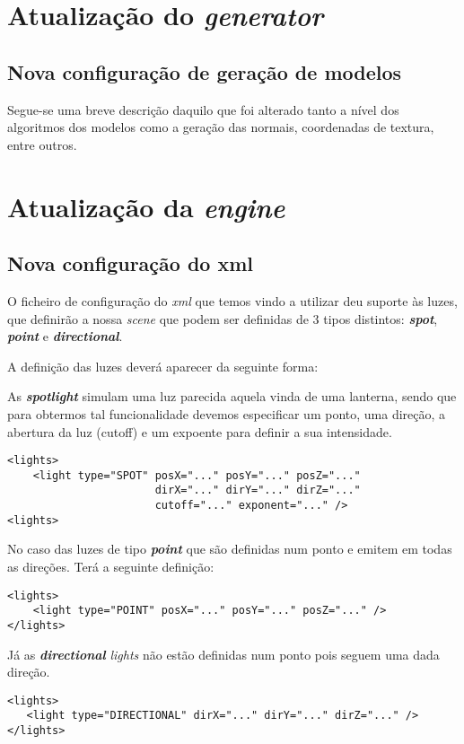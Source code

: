 \documentclass[11pt,a4paper]{report}
\begin{document}
\chapter{Atualização do \emph{generator}}
\section{Nova configuração de geração de modelos}

Segue-se uma breve descrição daquilo que foi alterado tanto a nível dos algoritmos dos modelos como a geração das normais, coordenadas de textura, entre outros.

\chapter{Atualização da \emph{engine}}

\section{Nova configuração do xml}
O ficheiro de configuração do \emph{xml} que temos vindo a utilizar deu suporte às luzes, que definirão a nossa \emph{scene} que podem ser definidas de 3 tipos distintos: \textbf{\emph{spot}}, \textbf{ \emph{point}} e \textbf{\emph{directional}}.

A definição das luzes deverá aparecer da seguinte forma: 

As \textbf{\emph{spotlight}} simulam uma luz parecida aquela vinda de uma lanterna, sendo que para obtermos tal funcionalidade devemos especificar um ponto, uma direção, a abertura da luz (cutoff) e um expoente para definir a sua intensidade.

\begin{lstlisting}[style = xml]
<lights>
    <light type="SPOT" posX="..." posY="..." posZ="..."
                       dirX="..." dirY="..." dirZ="..."
                       cutoff="..." exponent="..." />
<lights>
\end{lstlisting}

No caso das luzes de tipo \textbf{ \emph{point}} que são definidas num ponto e emitem em todas as direções. Terá a seguinte definição:

\begin{lstlisting}[style = xml]
<lights>
    <light type="POINT" posX="..." posY="..." posZ="..." />
</lights>
\end{lstlisting}

Já as \textbf{\emph{directional}} \emph{lights} não estão definidas num ponto pois seguem uma dada direção.
\begin{lstlisting}[style = xml]
<lights>
   <light type="DIRECTIONAL" dirX="..." dirY="..." dirZ="..." />
</lights>
\end{lstlisting}
\end{document}
